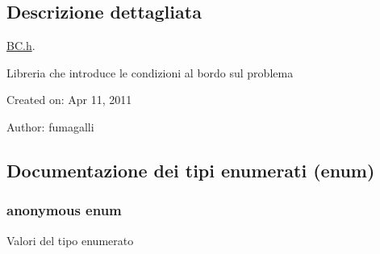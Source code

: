 \subsection{Descrizione dettagliata}
\hyperlink{BC_8h}{B\-C.\-h}. 

Libreria che introduce le condizioni al bordo sul problema

Created on\-: Apr 11, 2011

Author\-: fumagalli 

\subsection{Documentazione dei tipi enumerati (enum)}
\hypertarget{classBC_ad1b507696802f73b95c0ca59f4c41390}{\subsubsection[{anonymous enum}]{\setlength{\rightskip}{0pt plus 5cm}anonymous enum}}\label{classBC_ad1b507696802f73b95c0ca59f4c41390}
\begin{Desc}
\item[Valori del tipo enumerato]\par
\begin{description}
\item[{\em 
\hypertarget{classBC_ad1b507696802f73b95c0ca59f4c41390a99103ccd54ba29b1bd2670cc6cd0c462}{D\-I\-R\-I\-C\-H\-L\-E\-T\-\_\-\-B\-O\-U\-N\-D\-A\-R\-Y\-\_\-\-N\-U\-M}\label{classBC_ad1b507696802f73b95c0ca59f4c41390a99103ccd54ba29b1bd2670cc6cd0c462}
}]\item[{\em 
\hypertarget{classBC_ad1b507696802f73b95c0ca59f4c41390a432aa77a00d8eb4929463ef8d57b5c04}{N\-E\-U\-M\-A\-N\-N\-\_\-\-B\-O\-U\-N\-D\-A\-R\-Y\-\_\-\-N\-U\-M}\label{classBC_ad1b507696802f73b95c0ca59f4c41390a432aa77a00d8eb4929463ef8d57b5c04}
}]\end{description}
\end{Desc}

